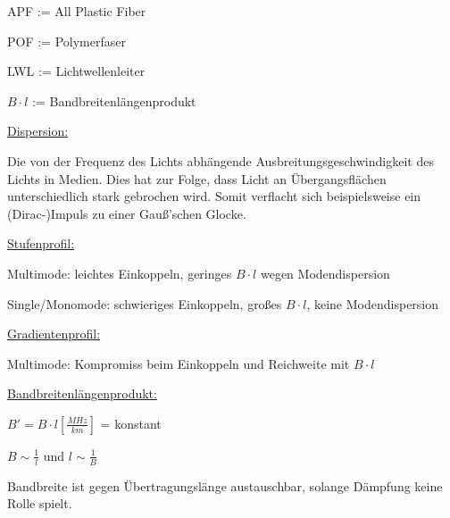\begin{description}
    \setlength\itemsep{1pt}
    \item APF := All Plastic Fiber
    \item POF := Polymerfaser
    \item LWL := Lichtwellenleiter
    \item $B\cdot l$ := Bandbreitenlängenprodukt
\end{description}

\begin{description}
    \item \underline{Dispersion:}

          {\small Die von der Frequenz des Lichts abhängende
              Ausbreitungsgeschwindigkeit des Lichts in Medien. Dies hat zur Folge,
              dass Licht an Übergangsflächen unterschiedlich stark gebrochen wird.
              Somit verflacht sich beispielsweise ein (Dirac-)Impuls zu einer Gauß'schen
              Glocke.
          }
    \item \underline{Stufenprofil:}

          {\small Multimode: leichtes Einkoppeln, geringes $B\cdot l$ wegen
              Modendispersion

              Single/Monomode: schwieriges Einkoppeln, großes $B\cdot l$, keine
              Modendispersion
          }
    \item \underline{Gradientenprofil:}

          {\small Multimode: Kompromiss beim Einkoppeln und Reichweite mit $B\cdot l$}
    \item \underline{Bandbreitenlängenprodukt:}

          {\small $B' =  B\cdot l[\frac{MHz}{km}]$ = konstant

              $B \sim \frac{1}{l}$ und $l\sim \frac{1}{B}$

              Bandbreite ist gegen Übertragungslänge austauschbar, solange
              Dämpfung keine Rolle spielt.
          }
\end{description}
